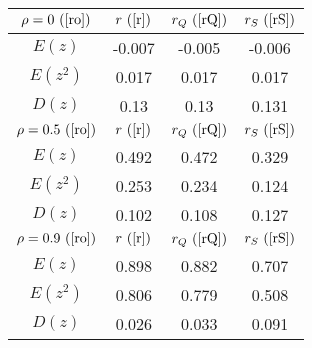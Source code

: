 \begin{tabular}{|c|c|c|c|}
\hline
$\rho = 0~(\ref{ro})$ & $r ~(\ref{r})$ & $r_Q ~(\ref{rQ})$ & $r_S ~(\ref{rS})$\\
\hline
$E(z)$ & -0.007 & -0.005 & -0.006\\
\hline
$E(z^2)$ & 0.017 & 0.017 & 0.017\\
\hline
$D(z)$ & 0.13 & 0.13 & 0.131\\
\hline
$\rho = 0.5~(\ref{ro})$ & $r ~(\ref{r})$ & $r_Q ~(\ref{rQ})$ & $r_S ~(\ref{rS})$\\
\hline
$E(z)$ & 0.492 & 0.472 & 0.329\\
\hline
$E(z^2)$ & 0.253 & 0.234 & 0.124\\
\hline
$D(z)$ & 0.102 & 0.108 & 0.127\\
\hline
$\rho = 0.9~(\ref{ro})$ & $r ~(\ref{r})$ & $r_Q ~(\ref{rQ})$ & $r_S ~(\ref{rS})$\\
\hline
$E(z)$ & 0.898 & 0.882 & 0.707\\
\hline
$E(z^2)$ & 0.806 & 0.779 & 0.508\\
\hline
$D(z)$ & 0.026 & 0.033 & 0.091\\
\hline
\end{tabular}